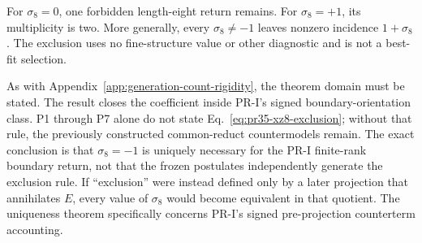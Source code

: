 For $\sigma_8=0$, one forbidden length-eight return remains.  For $\sigma_8=+1$, its multiplicity is two.  More generally, every $\sigma_8\ne-1$ leaves nonzero incidence $1+\sigma_8$.  The exclusion uses no fine-structure value or other diagnostic and is not a best-fit selection.

As with Appendix~\ref{app:generation-count-rigidity}, the theorem domain must be stated.  The result closes the coefficient inside PR-I's signed boundary-orientation class.  P1 through P7 alone do not state Eq.~\eqref{eq:pr35-xz8-exclusion}; without that rule, the previously constructed common-reduct countermodels remain.  The exact conclusion is that $\sigma_8=-1$ is uniquely necessary for the PR-I finite-rank boundary return, not that the frozen postulates independently generate the exclusion rule. If ``exclusion'' were instead defined only by a later projection that annihilates $E$, every value of $\sigma_8$ would become equivalent in that quotient.  The uniqueness theorem specifically concerns PR-I's signed pre-projection counterterm accounting.

